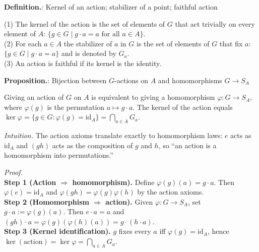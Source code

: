 \documentclass[12pt]{article}
\theoremstyle{definition}
\begin{document}
\noindent\textbf{Definition.}: Kernel of an action; stabilizer of a point; faithful action

\newpage

(1) The kernel of the action is the set of elements of $G$ that act trivially on every element of $A$: $\{g\in G\mid g\cdot a=a\text{ for all }a\in A\}$.\\
(2) For each $a\in A$ the stabilizer of $a$ in $G$ is the set of elements of $G$ that fix $a$: $\{g\in G\mid g\cdot a=a\}$ and is denoted by $G_a$.\\
(3) An action is faithful if its kernel is the identity.\\


\newpage


\noindent\textbf{Proposition.}: Bijection between $G$-actions on $A$ and homomorphisms $G\to S_A$

\newpage

Giving an action of $G$ on $A$ is equivalent to giving a homomorphism $\varphi:G\to S_A$, where $\varphi(g)$ is the permutation $a\mapsto g\cdot a$. The kernel of the action equals $\ker\varphi=\{g\in G:\varphi(g)=\mathrm{id}_A\}=\bigcap_{a\in A}G_a$.\\

\dotfill

\emph{Intuition.} The action axioms translate exactly to homomorphism laws: $e$ acts as $\mathrm{id}_A$ and $(gh)$ acts as the composition of $g$ and $h$, so “an action is a homomorphism into permutations.”

\dotfill

\emph{Proof.}\\
\textbf{Step 1 (Action $\Rightarrow$ homomorphism).} Define $\varphi(g)(a)=g\cdot a$. Then $\varphi(e)=\mathrm{id}_A$ and $\varphi(gh)=\varphi(g)\varphi(h)$ by the action axioms.\\
\textbf{Step 2 (Homomorphism $\Rightarrow$ action).} Given $\varphi:G\to S_A$, set $g\cdot a:=\varphi(g)(a)$. Then $e\cdot a=a$ and $(gh)\cdot a=\varphi(g)(\varphi(h)(a))=g\cdot(h\cdot a)$.\\
\textbf{Step 3 (Kernel identification).} $g$ fixes every $a$ iff $\varphi(g)=\mathrm{id}_A$, hence $\ker(\text{action})=\ker\varphi=\bigcap_{a\in A}G_a$.\\
\end{document}
